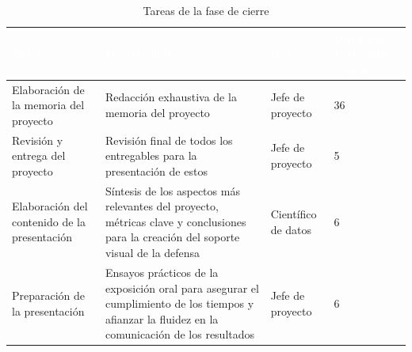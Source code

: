 \begin{table}[htp]
	\centering
	\begin{tabular}{ | m{4cm} | m{6cm} | m{2cm} | m{2cm} | }
		\hline
		\rowcolor[HTML]{5B9BD5} 
		\textcolor{white}{\textbf{Tarea}} & \textcolor{white}{\textbf{Descripción}} & \textcolor{white}{\textbf{Rol}} & \textcolor{white}{\textbf{Duración Estimada (horas)}} \\
		\hline
		
		Elaboración de la memoria del proyecto & Redacción exhaustiva de la memoria del proyecto & Jefe de proyecto & 36 \\
		\hline
		Revisión y entrega del proyecto & Revisión final de todos los entregables para la presentación de estos & Jefe de proyecto & 5 \\
		\hline
		Elaboración del contenido de la presentación & Síntesis de los aspectos más relevantes del proyecto, métricas clave y conclusiones para la creación del soporte visual de la defensa & Científico de datos & 6 \\
		\hline
		Preparación de la presentación & Ensayos prácticos de la exposición oral para asegurar el cumplimiento de los tiempos y afianzar la fluidez en la comunicación de los resultados &  Jefe de proyecto & 6 \\
		\hline
		
	\end{tabular} 
	
	\caption{Tareas de la fase de cierre}
\end{table}